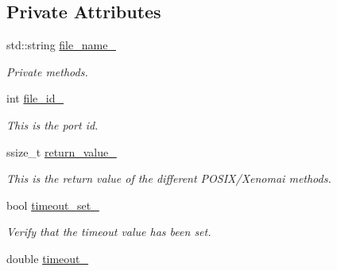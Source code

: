 \subsection*{Private Attributes}
\begin{DoxyCompactItemize}
\item 
std\+::string \hyperlink{classreal__time__tools_1_1UsbStream_ac8d1e2727668e9549dda2038248943d5}{file\+\_\+name\+\_\+}
\begin{DoxyCompactList}\small\item\em Private methods. \end{DoxyCompactList}\item 
\mbox{\label{classreal__time__tools_1_1UsbStream_a52bf9e29fde33e865daef464a01738af}} 
int \hyperlink{classreal__time__tools_1_1UsbStream_a52bf9e29fde33e865daef464a01738af}{file\+\_\+id\+\_\+}
\begin{DoxyCompactList}\small\item\em This is the port id. \end{DoxyCompactList}\item 
\mbox{\label{classreal__time__tools_1_1UsbStream_a272dd207ec047d29b00e099bff188ac6}} 
ssize\+\_\+t \hyperlink{classreal__time__tools_1_1UsbStream_a272dd207ec047d29b00e099bff188ac6}{return\+\_\+value\+\_\+}
\begin{DoxyCompactList}\small\item\em This is the return value of the different P\+O\+S\+I\+X/\+Xenomai methods. \end{DoxyCompactList}\item 
\mbox{\label{classreal__time__tools_1_1UsbStream_a76378aaeca606027408ebd5c7f06e97e}} 
bool \hyperlink{classreal__time__tools_1_1UsbStream_a76378aaeca606027408ebd5c7f06e97e}{timeout\+\_\+set\+\_\+}
\begin{DoxyCompactList}\small\item\em Verify that the timeout value has been set. \end{DoxyCompactList}\item 
\mbox{\label{classreal__time__tools_1_1UsbStream_afa70d692f2715d9a42e1a2d3a91f876a}} 
double \hyperlink{classreal__time__tools_1_1UsbStream_afa70d692f2715d9a42e1a2d3a91f876a}{timeout\+\_\+}

\end{DoxyCompactItemize}
